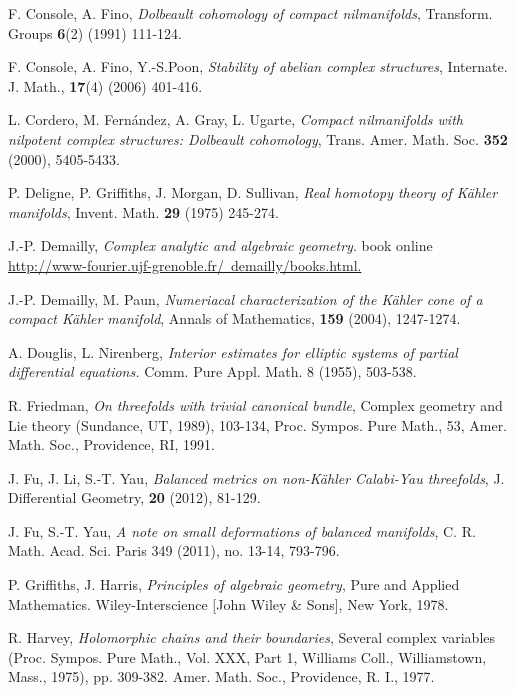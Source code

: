 \documentclass[12pt]{amsart}
\numberwithin{equation}{section}
\renewcommand{\1}{\mathds{1}}
\renewcommand{\>}{\rightarrow}
\begin{document}
\begin{thebibliography}{99}
 F. Console, A. Fino,
\newblock \textit{Dolbeault cohomology of compact nilmanifolds},
\newblock Transform. Groups \textbf{6}(2) (1991) 111-124.

 F. Console, A. Fino, Y.-S.Poon,
\newblock \textit{Stability of abelian complex structures},
\newblock Internate. J. Math., \textbf{17}(4) (2006) 401-416.

 L. Cordero, M. Fern\'{a}ndez, A. Gray, L. Ugarte,
\newblock \textit{Compact nilmanifolds with nilpotent complex structures: Dolbeault cohomology},
\newblock Trans. Amer. Math. Soc. \textbf{352} (2000), 5405-5433.


 P. Deligne, P. Griffiths, J. Morgan, D. Sullivan,
\newblock \textit{Real homotopy theory of K\"ahler manifolds},
\newblock Invent. Math. \textbf{29} (1975) 245-274.

 J.-P. Demailly,
\newblock \textit{Complex analytic and algebraic geometry}.
\newblock book online
\href{http://www-fourier.ujf-grenoble.fr/~demailly/books.html}{http://www-fourier.ujf-grenoble.fr/~demailly/books.html.}

 J.-P. Demailly, M. Paun,
\newblock \textit{Numeriacal characterization of the K\"{a}hler cone
of a compact K\"{a}hler manifold},
\newblock Annals of Mathematics, \textbf{159} (2004), 1247-1274.


 A. Douglis, L. Nirenberg,
\newblock \textit{Interior estimates for elliptic
systems of partial differential equations.}
\newblock  Comm. Pure Appl. Math. 8 (1955), 503-538.


 R. Friedman,
\newblock \textit{On threefolds with trivial canonical bundle},
\newblock Complex geometry and Lie theory (Sundance, UT, 1989), 103-134,
Proc. Sympos. Pure Math., 53, Amer. Math. Soc., Providence, RI,
1991.


 J. Fu, J. Li, S.-T. Yau,
\newblock \textit{Balanced metrics on non-K\"{a}hler Calabi-Yau threefolds},
\newblock J. Differential Geometry, \textbf{20} (2012), 81-129.

 J. Fu, S.-T. Yau,
\newblock \textit{A note on small deformations of
balanced manifolds},
\newblock  C. R. Math. Acad. Sci. Paris 349 (2011), no. 13-14, 793-796.


 P. Griffiths, J. Harris,
\newblock \textit{Principles of algebraic
geometry},
\newblock  Pure and Applied Mathematics. Wiley-Interscience [John
Wiley \& Sons], New York, 1978.


 R. Harvey,
\newblock \textit{Holomorphic chains and their boundaries},
\newblock  Several complex variables (Proc. Sympos. Pure Math., Vol. XXX, Part 1, Williams Coll., Williamstown, Mass., 1975), pp. 309-382. Amer. Math. Soc., Providence, R. I., 1977.


\end{thebibliography}
\end{document}
